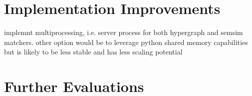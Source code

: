 \documentclass[11pt]{scrreprt}
\begin{document}
\section{Implementation Improvements}
implemnt multiprocessing, i.e. server process for both hypergraph and semsim matchers. other option would be to leverage python shared memory capabilities but is likely to be less stable and has less scaling potential

\section{Further Evaluations}



\printbibliography
\end{document}
